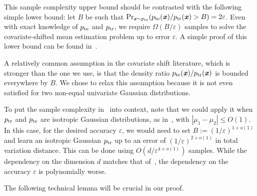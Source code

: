 \begin{remark}
    \label{rem:lower-bound}
    This sample complexity upper bound should be contrasted with the following simple lower bound: let $B$ be such that $\Pr_{\boldsymbol{\mathit{x}}\sim p_{\mathrm{te}}}(p_{\mathrm{te}}(\boldsymbol{\mathit{x}})/ p_{\mathrm{tr}}(\boldsymbol{\mathit{x}})> B) = 2 \varepsilon$. Even with exact knowledge of $p_{\mathrm{te}}$ and $p_{\mathrm{tr}}$, we require $\Omega(B/\varepsilon)$ samples to solve the covariate-shifted mean estimation problem up to error $\varepsilon$. A simple proof of this lower bound can be found in~.
\end{remark}
A relatively common assumption in the covariate shift literature, which is stronger than the one we use, is that the density ratio $p_{\mathrm{te}}(\boldsymbol{\mathit{x}})/p_{\mathrm{tr}}(\boldsymbol{\mathit{x}})$ is bounded everywhere by $B$. We chose to relax this assumption because it is not even satisfied for two non-equal univariate Gaussian distributions.

To put the sample complexity in~ into context, note that we could apply it when $p_{\mathrm{tr}}$ and $p_{\mathrm{te}}$ are isotropic Gaussian distributions, as in~, with $|\mu_1 - \mu_2| \leq O(1)$. In this case, for the desired accuracy $\varepsilon$, we would need to set $B := (1/\varepsilon)^{1 + o(1)}$ and learn an isotropic Gaussian $p_{\mathrm{tr}}$ up to an error of $(1/\varepsilon)^{2 + o(1)}$ in total variation distance. This can be done using $O(d/\varepsilon^{4 + o(1)})$ samples. While the dependency on the dimension $d$ matches that of~, the dependency on the accuracy $\varepsilon$ is polynomially worse.

The following technical lemma will be crucial in our proof.

